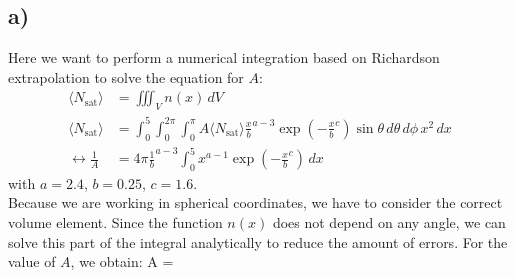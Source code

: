 \subsection*{a)}
Here we want to perform a numerical integration based on Richardson extrapolation to solve the equation for \( A \):
\begin{align}
    \langle N_{\text{sat}} \rangle &= \iiint_V n(x) \, dV \\
    \langle N_{\text{sat}} \rangle &= \int_0^5 \int_0^{2\pi} \int_{0}^{\pi} A \langle N_{\text{sat}} \rangle \frac{x}{b}^{a-3} \exp\left(-\frac{x}{b}^c\right) \sin \theta \, d\theta \, d\phi \, x^2 \, dx \\
    \leftrightarrow \frac{1}{A} &= 4 \pi \frac{1}{b}^{a-3} \int_0^5 x^{a-1} \exp\left(-\frac{x}{b}^c\right) \, dx
\end{align}
with \( a = 2.4 \), \( b = 0.25 \), \( c = 1.6 \). \\
Because we are working in spherical coordinates, we have to consider the correct volume element. Since the function \( n(x) \) does not depend on any angle, we can solve this part of the integral analytically to reduce the amount of errors. 
For the value of \( A \), we obtain: A = 



